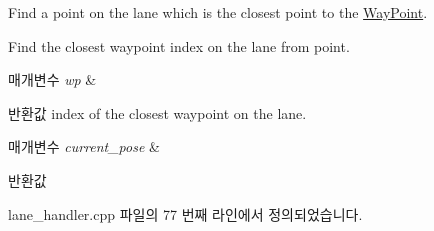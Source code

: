 Find a point on the lane which is the closest point to the \hyperlink{class_way_point}{Way\+Point}. 

Find the closest waypoint index on the lane from point.


\begin{DoxyParams}{매개변수}
{\em wp} & \\
\hline
\end{DoxyParams}
\begin{DoxyReturn}{반환값}
index of the closest waypoint on the lane.
\end{DoxyReturn}

\begin{DoxyParams}{매개변수}
{\em current\+\_\+pose} & \\
\hline
\end{DoxyParams}
\begin{DoxyReturn}{반환값}

\end{DoxyReturn}


lane\+\_\+handler.\+cpp 파일의 77 번째 라인에서 정의되었습니다.


